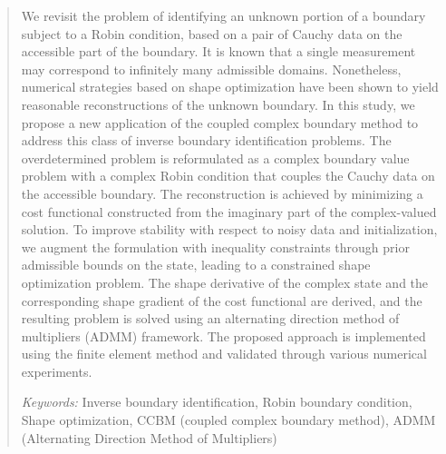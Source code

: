 \documentclass[a4paper,11pt]{article}
\begin{document}
\maketitle
\begin{abstract}
We revisit the problem of identifying an unknown portion of a boundary subject to a Robin condition, based on a pair of Cauchy data on the accessible part of the boundary.
It is known that a single measurement may correspond to infinitely many admissible domains.
Nonetheless, numerical strategies based on shape optimization have been shown to yield reasonable reconstructions of the unknown boundary.
%
In this study, we propose a new application of the coupled complex boundary method to address this class of inverse boundary identification problems. The overdetermined problem is reformulated as a complex boundary value problem with a complex Robin condition that couples the Cauchy data on the accessible boundary. The reconstruction is achieved by minimizing a cost functional constructed from the imaginary part of the complex-valued solution.
%
To improve stability with respect to noisy data and initialization, we augment the formulation with inequality constraints through prior admissible bounds on the state, leading to a constrained shape optimization problem. The shape derivative of the complex state and the corresponding shape gradient of the cost functional are derived, and the resulting problem is solved using an alternating direction method of multipliers (ADMM) framework. The proposed approach is implemented using the finite element method and validated through various numerical experiments.

\medskip

\textit{Keywords:}{ Inverse boundary identification, Robin boundary condition, Shape optimization, CCBM (coupled complex boundary method), ADMM (Alternating Direction Method of Multipliers)}
\end{abstract}














\end{document}
